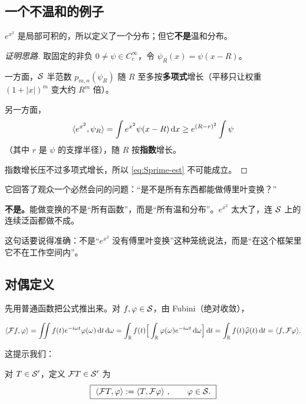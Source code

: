 \subsection{一个不温和的例子}

\begin{prop}\label{prop:ex2}
$e^{x^{2}}$ 是局部可积的，所以定义了一个分布；但它\textbf{不是}温和分布。
\end{prop}

\begin{proof}[证明思路]
取固定的非负 $0\neq\psi\in C_c^{\infty}$，令 $\psi_R(x)=\psi(x-R)$。

一方面，$\mathcal{S}$ 半范数 $p_{m,n}(\psi_R)$ 随 $R$ 至多按\textbf{多项式}增长（平移只让权重 $(1+|x|)^{m}$ 变大约 $R^{m}$ 倍）。

另一方面，
\begin{equation}
\langle e^{x^{2}},\psi_R\rangle=\int e^{x^{2}}\psi(x-R)\mathop{}\!\mathrm{d} x\ge e^{(R-r)^{2}}\int\psi
\end{equation}
（其中 $r$ 是 $\psi$ 的支撑半径），随 $R$ 按\textbf{指数}增长。

指数增长压不过多项式增长，所以 \eqref{eq:Sprime-est} 不可能成立。
\end{proof}

\begin{ideabox}[这个反例的意义]
它回答了观众一个必然会问的问题：“是不是所有东西都能做傅里叶变换？”

\textbf{不是。}能做变换的不是“所有函数”，而是“所有温和分布”。$e^{x^{2}}$ 太大了，连 $\mathcal{S}$ 上的连续泛函都做不成。

这句话要说得准确：不是“$e^{x^{2}}$ 没有傅里叶变换”这种笼统说法，而是“在这个框架里它不在工作空间内”。
\end{ideabox}

\subsection{对偶定义}

先用普通函数把公式推出来。对 $f,\varphi\in\mathcal{S}$，由 Fubini（绝对收敛），

\begin{equation}
\langle \mathcal{F} f,\varphi\rangle
=\iint f(t)e^{-i\omega t}\varphi(\omega)\mathop{}\!\mathrm{d} t\mathop{}\!\mathrm{d}\omega
=\int_{\mathbb{R}}f(t)\Big[\int_{\mathbb{R}}\varphi(\omega)e^{-i\omega t}\mathop{}\!\mathrm{d}\omega\Big]\mathop{}\!\mathrm{d} t
=\int_{\mathbb{R}}f(t)\widehat{\varphi}(t)\mathop{}\!\mathrm{d} t
=\langle f,\mathcal{F}\varphi\rangle .
\end{equation}

这提示我们：

\begin{defn}[分布的傅里叶变换]\label{def:FTdist}
对 $T\in\mathcal{S}'$，定义 $\mathcal{F} T\in\mathcal{S}'$ 为
\begin{equation}
\boxed{\ \ip{\F T}{\varphi}:=\ip{T}{\F\varphi}\ ,\qquad \varphi\in\Sv .\ }\label{eq:dual}
\end{equation}
\end{defn}

